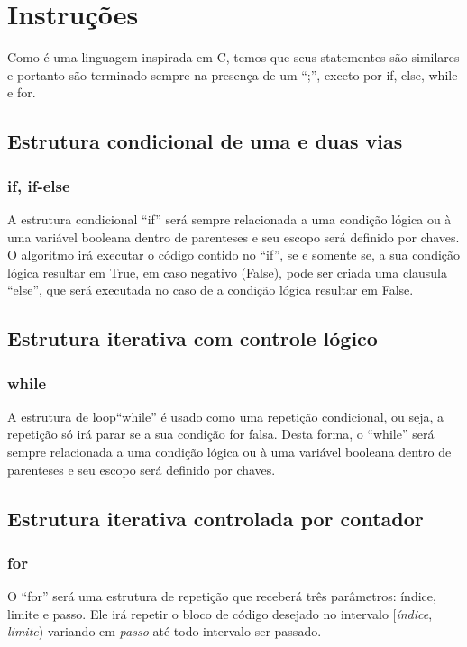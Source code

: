 \documentclass[a4paper, 12pt, article]{memoir}
\begin{document}
\section{Instruções}
\label{sec:instrucoes}
Como é uma linguagem inspirada em C, temos que seus statementes são similares e portanto são terminado sempre na presença de um ``;'', exceto por if, else, while e for.

\subsection{Estrutura condicional de uma e duas vias}
\label{sub:estruturacondicional}

\subsubsection{if, if-else}
\label{subsubsec:if}
A estrutura condicional ``if'' será sempre relacionada a uma condição lógica ou à uma variável booleana dentro de
parenteses e seu escopo será definido por chaves. O algoritmo irá executar o código contido no ``if'', se e somente se, a sua condição lógica resultar em True, em caso negativo (False), pode ser criada uma clausula ``else'', que será executada no caso de a condição lógica resultar em False.

\subsection{Estrutura iterativa com controle lógico}
\label{subsec:iterativalogico}

\subsubsection{while}
\label{subsubsec:while}
A estrutura de loop``while'' é usado como uma repetição condicional, ou seja, a repetição só irá
parar se a sua condição for falsa. Desta forma, o ``while'' será sempre relacionada a uma condição lógica ou à uma variável booleana dentro de parenteses e seu escopo será definido por chaves.


\subsection{Estrutura iterativa controlada por contador}
\label{subsec:iterativacontador}

\subsubsection{for}
\label{subsubsec:for}
O ``for'' será uma estrutura de repetição que receberá três parâmetros: índice,
limite e passo. Ele irá repetir o bloco de código desejado no intervalo
[\emph{índice}, \emph{limite}) variando em \emph{passo} até todo intervalo
ser passado.
\end{document}
